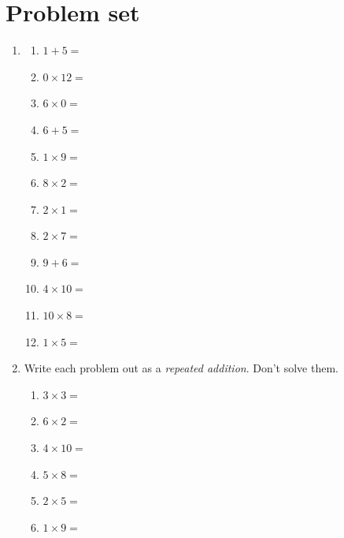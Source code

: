 \documentclass{tufte-book}
\begin{document}
\clearpage\section{Problem set }
\begin{enumerate}
\item
\begin{multicols}{3}
\begin{enumerate}
      \item $1 + 5=$ \dotfill\bigskip
      \item $0 \times 12=$ \dotfill\bigskip
      \item $6 \times 0=$ \dotfill\bigskip
      \item $6 + 5=$ \dotfill
      \item $1 \times 9=$ \dotfill\bigskip
      \item $8 \times 2=$ \dotfill\bigskip
      \item $2 \times 1=$ \dotfill\bigskip
      \item $2 \times 7=$ \dotfill
      \item $9 + 6=$ \dotfill\bigskip
      \item $4 \times 10=$ \dotfill\bigskip
      \item $10 \times 8=$ \dotfill\bigskip
      \item $1 \times 5=$ \dotfill
\end{enumerate}
\end{multicols}

\item Write each problem out as a \textit{repeated addition}. Don't solve them.\bigskip
\begin{multicols}{2}
\begin{enumerate}
  \item $3 \times 3 = $\dotfill\bigskip
  \item $6 \times 2 = $\dotfill\bigskip
  \item $4 \times 10 = $\dotfill
  \item $5 \times 8 = $\dotfill\bigskip
  \item $2 \times 5 = $\dotfill\bigskip
  \item $1 \times 9 = $\dotfill
\end{enumerate}
\end{multicols}


\end{enumerate}
\end{document}
